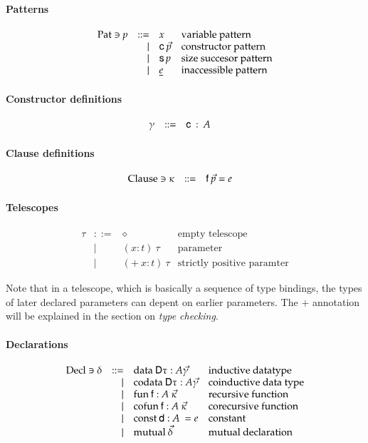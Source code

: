 \paragraph*{Patterns}
\[
\begin{array}{lrll}
\mathrm{Pat} \ni p & ::= & x & \mbox{variable pattern}\\
& \mid & \mathsf{c} \: \vec{p} & \mbox{constructor pattern}\\
& \mid & \mathsf{s}\, p & \mbox{size succesor pattern}\\
& \mid & \underline{e} & \mbox{inaccessible pattern}\\
\end{array}
\]

\paragraph*{Constructor definitions}
\[
\begin{array}{lrll}
\gamma &  ::= & \mathsf{c} \: : \: A & 
\end{array}
\]

\paragraph*{Clause definitions}
\[
\begin{array}{lrll}
\mathrm{Clause} \ni \kappa & ::= & \mathsf{f} \: \vec{p} = e & 
\end{array}
\]

\paragraph*{Telescopes}
\[
\begin{array}{lrll}
\tau & ::= & \diamond & \mbox{empty telescope}\\
& \mid & ( x : t ) \: \tau & \mbox{parameter}\\
& \mid & ( + \: x : t ) \: \tau & \mbox{strictly positive paramter}
\end{array}
\]

Note that in a telescope, which is basically a sequence of type bindings, the types of later declared parameters can depent on earlier parameters. The $+$ annotation will be explained in the section on \emph{type checking}. 

\paragraph*{Declarations}
\[
\begin{array}{lrll}
\mathrm{Decl} \ni \delta & ::= & \mathrm{data}\: \mathsf{D} \tau : A \vec{\gamma} & \mbox{inductive datatype}\\ 
& \mid & \mathrm{codata}\: \mathsf{D} \tau : A \vec{\gamma} & \mbox{coinductive data type} \\
& \mid & \mathrm{fun}\: \mathsf{f} : A \: \vec{\kappa} & \mbox{recursive function}\\
& \mid & \mathrm{cofun}\: \mathsf{f} : A \: \vec{\kappa} & \mbox{corecursive function}\\ 
& \mid & \mathrm{const}\: \mathsf{d} : A \: = e & \mbox{constant}\\
& \mid & \mathrm{mutual}\: \vec{\delta} & \mbox{mutual declaration}
\end{array}
\]



